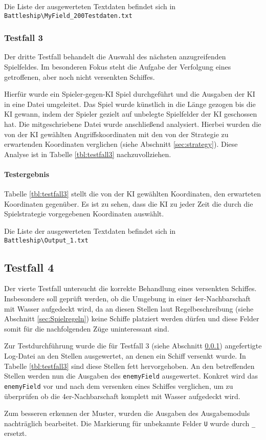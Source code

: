 		Die Liste der ausgewerteten Textdaten befindet sich in \texttt{Battle\-ship\textbackslash \-MyField\-\_200\-Test\-daten.txt}
	\subsubsection{Testfall 3} %
	\label{ssub:testfall_3}
	
	Der dritte Testfall behandelt die Auswahl des nächsten anzugreifenden Spielfeldes. Im besonderen Fokus steht die Aufgabe der Verfolgung eines 
	getroffenen, aber noch nicht versenkten Schiffes.
	
	Hierfür wurde ein Spieler-gegen-KI Spiel durchgeführt und die Ausgaben der KI in eine Datei umgeleitet. Das Spiel wurde künstlich in die Länge 
	gezogen bis die KI gewann, indem der Spieler gezielt auf unbelegte Spielfelder der KI geschossen hat.
	Die mitgeschriebene Datei wurde anschließend analysiert. Hierbei wurden die von der KI gewählten Angriffskoordinaten mit den
	von der Strategie zu erwartenden Koordinaten verglichen (siehe Abschnitt \ref{sec:strategy}). Diese Analyse ist in Tabelle \ref{tbl:testfall3} nachzuvollziehen.
	
	
	\paragraph{Testergebnis} %
	\label{par:testergebnis}
	 Tabelle \ref{tbl:testfall3} stellt die von der KI gewählten Koordinaten, den erwarteten Koordinaten gegenüber. Es ist zu sehen, dass die KI zu jeder Zeit 
	die durch die Spielstrategie vorgegebenen Koordinaten auswählt.
	
	Die Liste der ausgewerteten Textdaten befindet sich in \texttt{Battle\-ship\textbackslash \-Out\-put\_1.txt}
	\subsection{Testfall 4} %
	\label{sub:testfall_4}
		Der vierte Testfall untersucht die korrekte Behandlung eines versenkten Schiffes. Insbesondere soll geprüft werden, ob die Umgebung in 
		einer 4er-Nachbarschaft
		mit Wasser aufgedeckt wird, da an diesen Stellen laut Regelbeschreibung (siehe Abschnitt \ref{sec:Spielregeln}) keine Schiffe platziert werden dürfen 
		und diese Felder somit für die nachfolgenden Züge uninteressant sind.
		
		Zur Testdurchführung wurde die für Testfall 3 (siehe Abschnitt \ref{ssub:testfall_3}) angefertigte Log-Datei an den Stellen ausgewertet, an denen ein 
		Schiff versenkt wurde. In Tabelle \ref{tbl:testfall3} sind diese Stellen fett hervorgehoben.
		An den betreffenden Stellen werden nun die Ausgaben des \texttt{enemyField} ausgewertet. Konkret wird das \texttt{enemyField} vor und 
		nach dem versenken eines Schiffes verglichen, um zu überprüfen ob die 4er-Nachbarschaft komplett mit Wasser aufgedeckt wird.
		
		Zum besseren erkennen der Muster, wurden die Ausgaben des Ausgabemoduls nachträglich bearbeitet. Die Markierung für unbekannte Felder \texttt{U} wurde 
		durch \texttt{\_} ersetzt.
